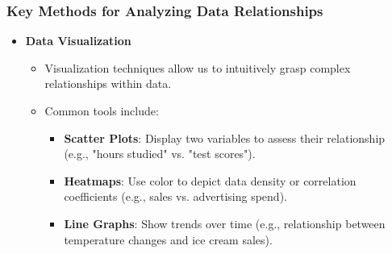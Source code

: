 \documentclass[aspectratio=169]{beamer}
\begin{document}
\begin{frame}[fragile]
    \frametitle{Key Methods for Analyzing Data Relationships}
    \begin{itemize}
        \item \textbf{Data Visualization}
        \begin{itemize}
            \item Visualization techniques allow us to intuitively grasp complex relationships within data.
            \item Common tools include:
            \begin{itemize}
                \item \textbf{Scatter Plots}: Display two variables to assess their relationship (e.g., "hours studied" vs. "test scores").
                \item \textbf{Heatmaps}: Use color to depict data density or correlation coefficients (e.g., sales vs. advertising spend).
                \item \textbf{Line Graphs}: Show trends over time (e.g., relationship between temperature changes and ice cream sales).
            \end{itemize}
        \end{itemize}
    \end{itemize}
\end{frame}
\end{document}
